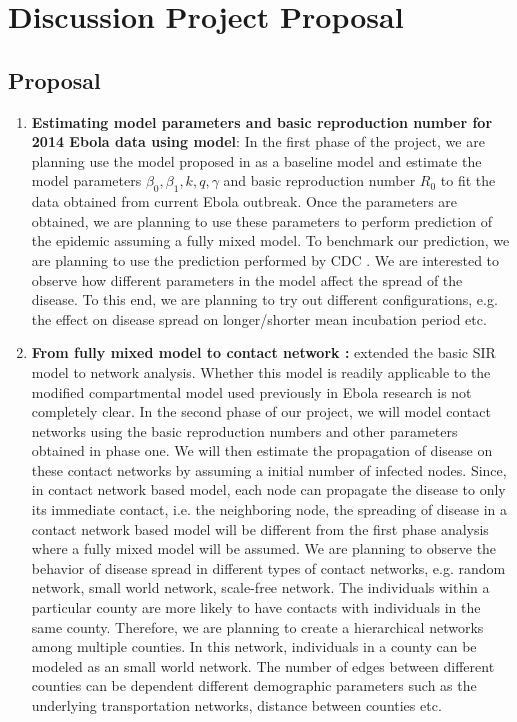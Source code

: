 \documentclass[12pt, journal,onecolumn]{IEEEtran}
\begin{document}
\bigskip


\section{Discussion Project Proposal}
\label{sec:ProjectProposal}

\subsection{Proposal}

\bigskip

\begin{enumerate}
\item \textbf{Estimating model parameters and basic reproduction number for 2014 Ebola data using \citep{chowell2004basic} model}: In the first phase of the project, we are planning use the model proposed in \citep{chowell2004basic}  as a baseline model and estimate the model parameters  $\beta_0, \beta_1, k, q, \gamma$  and basic reproduction number $R_0$ to fit the data obtained from current Ebola outbreak. Once the parameters are obtained, we are planning to use these parameters to perform prediction of the epidemic assuming a fully mixed model. To benchmark our prediction, we are planning to use the prediction performed by CDC \citep{meltzer2014estimating}. We are interested to observe how different parameters in the model affect the spread of the disease. To this end, we are planning to try out different configurations, e.g. the effect on disease spread on  longer/shorter mean incubation period etc.

\item \textbf{From fully mixed model to contact network : } \citep{newman2002spread, meyers2005network} extended the basic SIR model to network analysis. Whether this model is readily applicable to the modified compartmental model used previously in Ebola research \citep{chowell2004basic, legrand2007understanding} is not completely clear. In the second phase of our project, we will model contact networks using the basic reproduction numbers and other parameters obtained in phase one. We will then estimate the propagation of disease on these contact networks by assuming a initial number of infected nodes. Since, in contact network based model, each node can propagate the disease to only its immediate contact, i.e. the neighboring node, the spreading of disease in a contact network based model will be different from the first phase analysis where a fully mixed model will be assumed. We are planning to observe the behavior of disease spread in different types of contact networks, e.g. random network, small world network, scale-free network. The individuals within a particular county are more likely to have contacts with individuals in the same county. Therefore, we are planning to create a hierarchical networks among multiple counties. In this network, individuals in a county can be modeled as an small world network. The number of edges between different counties can be dependent different demographic parameters such as the underlying transportation networks, distance between counties etc.


\end{enumerate}
\end{document}
